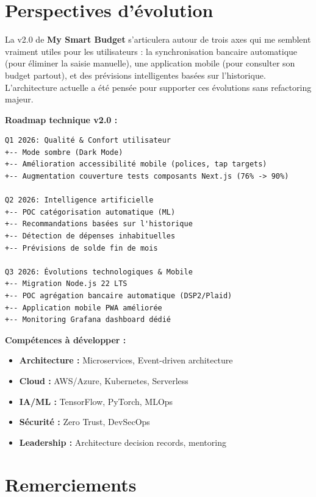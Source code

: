 \section{Perspectives d'évolution}

La v2.0 de \textbf{My Smart Budget} s'articulera autour de trois axes qui me semblent vraiment utiles pour les utilisateurs : la synchronisation bancaire automatique (pour éliminer la saisie manuelle), une application mobile (pour consulter son budget partout), et des prévisions intelligentes basées sur l'historique. L'architecture actuelle a été pensée pour supporter ces évolutions sans refactoring majeur.

\begin{exemple}
\textbf{Roadmap technique v2.0 :}
\begin{verbatim}
Q1 2026: Qualité & Confort utilisateur
+-- Mode sombre (Dark Mode)
+-- Amélioration accessibilité mobile (polices, tap targets)
+-- Augmentation couverture tests composants Next.js (76% -> 90%)

Q2 2026: Intelligence artificielle
+-- POC catégorisation automatique (ML)
+-- Recommandations basées sur l'historique
+-- Détection de dépenses inhabituelles
+-- Prévisions de solde fin de mois

Q3 2026: Évolutions technologiques & Mobile
+-- Migration Node.js 22 LTS
+-- POC agrégation bancaire automatique (DSP2/Plaid)
+-- Application mobile PWA améliorée
+-- Monitoring Grafana dashboard dédié
\end{verbatim}

\textbf{Compétences à développer :}
\begin{itemize}
    \item \textbf{Architecture :} Microservices, Event-driven architecture
    \item \textbf{Cloud :} AWS/Azure, Kubernetes, Serverless
    \item \textbf{IA/ML :} TensorFlow, PyTorch, MLOps
    \item \textbf{Sécurité :} Zero Trust, DevSecOps
    \item \textbf{Leadership :} Architecture decision records, mentoring
\end{itemize}
\end{exemple}




\section{Remerciements}

